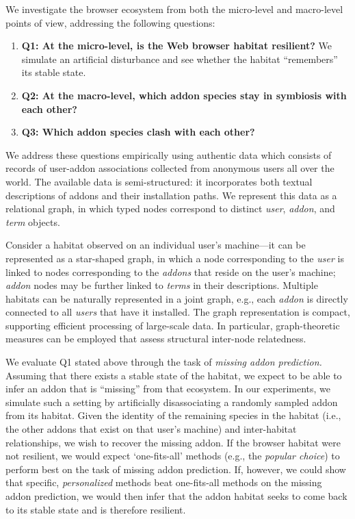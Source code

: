 \documentclass[ijoc,nonblindrev]{informs3} %
\numberwithin{equation}{subsection}
\begin{document}
We investigate the browser ecosystem from both the micro-level and macro-level points of view, addressing the following questions:\\
\begin{enumerate}
\item \textbf{Q1: At the micro-level, is the Web browser habitat resilient?} We simulate an artificial disturbance and see whether the habitat ``remembers'' its stable state.
\item \textbf{Q2: At the macro-level, which addon species stay in symbiosis with each other?}
\item \textbf{Q3: Which addon species clash with each other?}
\end{enumerate}

We address these questions empirically using authentic data which consists of records of user-addon associations collected from anonymous users all over the world. The available data is semi-structured: it incorporates both textual descriptions of addons and their installation paths. We represent this data as a relational graph, in which typed nodes correspond to distinct {\it user}, {\it addon}, and {\it term} objects. 

Consider a habitat observed on an individual user's machine---it can be represented as a star-shaped graph, in which a node corresponding to the \emph{user} is linked to nodes corresponding to the \emph{addons} that reside on the user's machine; {\it addon} nodes may be further linked to  {\it terms} in their descriptions. Multiple habitats can be naturally represented in a joint graph, e.g., each {\it addon} is directly connected to all {\it users} that have it installed. The graph representation is compact, supporting efficient processing of large-scale data. In particular, graph-theoretic measures can be employed that assess structural inter-node relatedness. 

We evaluate Q1 stated above through the task of {\it missing addon prediction.} Assuming that there exists a stable state of the habitat, we expect to be able to infer an addon that is ``missing'' from that ecosystem. In our experiments, we simulate such a setting by artificially disassociating a randomly sampled addon from its habitat. Given the identity of the remaining species in the habitat (i.e., the other addons that exist on that user's machine) and inter-habitat relationships, we wish to recover the missing addon. If the browser habitat were not resilient, we would expect `one-fits-all' methods (e.g., the \emph{popular choice}) to perform best on the task of missing addon prediction. If, however, we could show that specific, \emph{personalized} methods beat one-fits-all methods on the missing addon prediction, we would then infer that the addon habitat seeks to come back to its stable state and is therefore resilient. 
\end{document}
